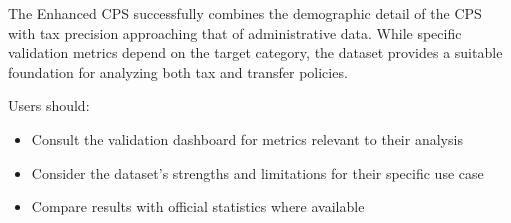 The Enhanced CPS successfully combines the demographic detail of the CPS with tax precision approaching that of administrative data. While specific validation metrics depend on the target category, the dataset provides a suitable foundation for analyzing both tax and transfer policies.

Users should:
\begin{itemize}
\item Consult the validation dashboard for metrics relevant to their analysis
\item Consider the dataset's strengths and limitations for their specific use case
\item Compare results with official statistics where available
\end{itemize}
